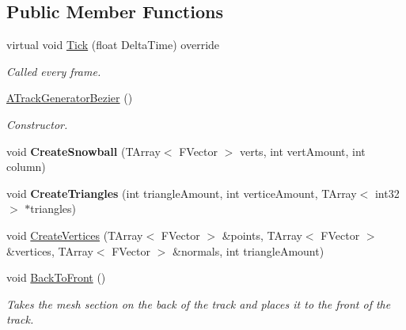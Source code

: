 \subsection*{Public Member Functions}
\begin{DoxyCompactItemize}
\item 
\mbox{\label{class_a_track_generator_bezier_a875dca0bb4c7cd9752963b59fd80d154}} 
virtual void \mbox{\hyperlink{class_a_track_generator_bezier_a875dca0bb4c7cd9752963b59fd80d154}{Tick}} (float Delta\+Time) override
\begin{DoxyCompactList}\small\item\em Called every frame. \end{DoxyCompactList}\item 
\mbox{\label{class_a_track_generator_bezier_a1a0bcd8948e1a9762e3ffaa931daf5fc}} 
\mbox{\hyperlink{class_a_track_generator_bezier_a1a0bcd8948e1a9762e3ffaa931daf5fc}{A\+Track\+Generator\+Bezier}} ()
\begin{DoxyCompactList}\small\item\em Constructor. \end{DoxyCompactList}\item 
\mbox{\label{class_a_track_generator_bezier_a990897162df45911ce327caebce1ad59}} 
void {\bfseries Create\+Snowball} (T\+Array$<$ F\+Vector $>$ verts, int vert\+Amount, int column)
\item 
\mbox{\label{class_a_track_generator_bezier_a378ebc7fed7fd43b9cbbd5a01fcac042}} 
void {\bfseries Create\+Triangles} (int triangle\+Amount, int vertice\+Amount, T\+Array$<$ int32 $>$ $\ast$triangles)
\item 
void \mbox{\hyperlink{class_a_track_generator_bezier_ad6951340681b89c847c10bf6f8fcd474}{Create\+Vertices}} (T\+Array$<$ F\+Vector $>$ \&points, T\+Array$<$ F\+Vector $>$ \&vertices, T\+Array$<$ F\+Vector $>$ \&normals, int triangle\+Amount)
\item 
void \mbox{\hyperlink{class_a_track_generator_bezier_a39d9dbc7a7a0d30ce12f5c2d46e8cd6f}{Back\+To\+Front}} ()
\begin{DoxyCompactList}\small\item\em Takes the mesh section on the back of the track and places it to the front of the track. \end{DoxyCompactList}\item 

\end{DoxyCompactItemize}
